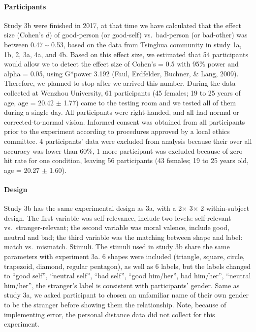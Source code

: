 \documentclass[
  english,
  man]{apa6}
\let\oldparagraph\paragraph
\renewcommand{\paragraph}[1]{\oldparagraph{#1}\mbox{}}
\begin{document}
\hypertarget{participants-6}{%
\paragraph{Participants}\label{participants-6}}

Study 3b were finished in 2017, at that time we have calculated that the effect size (Cohen's \(d\)) of good-person (or good-self) vs.~bad-person (or bad-other) was between 0.47 \textasciitilde{} 0.53, based on the data from Tsinghua community in study 1a, 1b, 2, 3a, 4a, and 4b. Based on this effect size, we estimated that 54 participants would allow we to detect the effect size of Cohen's = 0.5 with 95\% power and alpha = 0.05, using G*power 3.192 (Faul, Erdfelder, Buchner, \& Lang, 2009). Therefore, we planned to stop after we arrived this number. During the data collected at Wenzhou University, 61 participants (45 females; 19 to 25 years of age, age = 20.42 \(\pm\) 1.77) came to the testing room and we tested all of them during a single day. All participants were right-handed, and all had normal or corrected-to-normal vision. Informed consent was obtained from all participants prior to the experiment according to procedures approved by a local ethics committee. 4 participants' data were excluded from analysis because their over all accuracy was lower than 60\%, 1 more participant was excluded because of zero hit rate for one condition, leaving 56 participants (43 females; 19 to 25 years old, age = 20.27 \(\pm\) 1.60).

\hypertarget{design-1}{%
\paragraph{Design}\label{design-1}}

Study 3b has the same experimental design as 3a, with a 2× 3× 2 within-subject design. The first variable was self-relevance, include two levels: self-relevant vs.~stranger-relevant; the second variable was moral valence, include good, neutral and bad; the third variable was the matching between shape and label: match vs.~mismatch.
Stimuli. The stimuli used in study 3b share the same parameters with experiment 3a. 6 shapes were included (triangle, square, circle, trapezoid, diamond, regular pentagon), as well as 6 labels, but the labels changed to \enquote{good self}, \enquote{neutral self}, \enquote{bad self}, \enquote{good him/her}, bad him/her'', \enquote{neutral him/her}, the stranger's label is consistent with participants' gender. Same as study 3a, we asked participant to chosen an unfamiliar name of their own gender to be the stranger before showing them the relationship. Note, because of implementing error, the personal distance data did not collect for this experiment.
\end{document}

